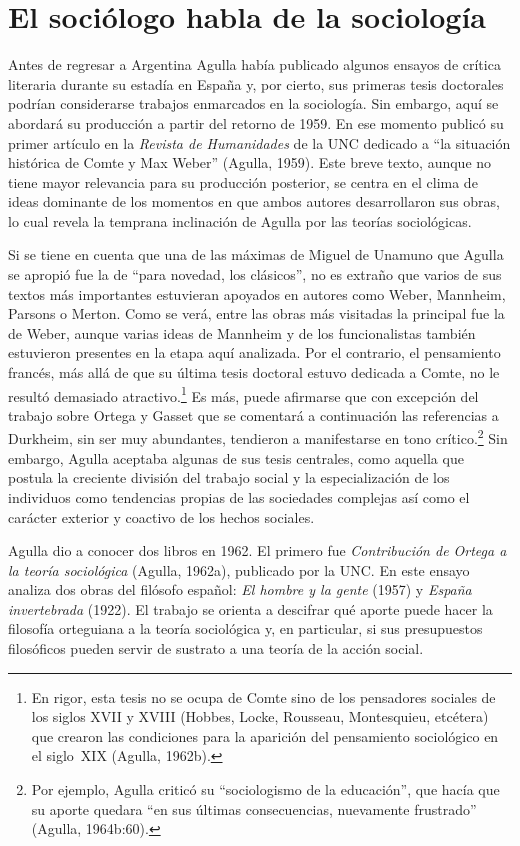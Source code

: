 \section{El sociólogo habla de la sociología}

Antes de regresar a Argentina Agulla había publicado algunos ensayos de crítica literaria durante su estadía en España y, por cierto, sus primeras tesis doctorales podrían considerarse trabajos enmarcados en la sociología. Sin embargo, aquí se abordará su producción a partir del retorno de 1959. En ese momento publicó su primer artículo en la \emph{Revista de Humanidades} de la UNC dedicado a ``la situación histórica de Comte y Max Weber'' (Agulla, 1959). Este breve texto, aunque no tiene mayor relevancia para su producción posterior, se centra en el clima de ideas dominante de los momentos en que ambos autores desarrollaron sus obras, lo cual revela la temprana inclinación de Agulla por las teorías sociológicas.

Si se tiene en cuenta que una de las máximas de Miguel de Unamuno que Agulla se apropió fue la de ``para novedad, los clásicos'', no es extraño que varios de sus textos más importantes estuvieran apoyados en autores como Weber, Mannheim, Parsons o Merton. Como se verá, entre las obras más visitadas la principal fue la de Weber, aunque varias ideas de Mannheim y de los funcionalistas también estuvieron presentes en la etapa aquí analizada. Por el contrario, el pensamiento francés, más allá de que su última tesis doctoral estuvo dedicada a Comte, no le resultó demasiado atractivo.\footnote{En rigor, esta tesis no se ocupa de Comte sino de los pensadores sociales de los siglos XVII y XVIII (Hobbes, Locke, Rousseau, Montesquieu, etcétera) que crearon las condiciones para la aparición del pensamiento sociológico en el siglo~XIX (Agulla, 1962b).} Es más, puede afirmarse que con excepción del trabajo sobre Ortega y Gasset que se comentará a continuación las referencias a Durkheim, sin ser muy abundantes, tendieron a manifestarse en tono crítico.\footnote{Por ejemplo, Agulla criticó su ``sociologismo de la educación'', que hacía que su aporte quedara ``en sus últimas consecuencias, nuevamente frustrado'' (Agulla, 1964b:60).} Sin embargo, Agulla aceptaba algunas de sus tesis centrales, como aquella que postula la creciente división del trabajo social y la especialización de los individuos como tendencias propias de las sociedades complejas así como el carácter exterior y coactivo de los hechos sociales.

Agulla dio a conocer dos libros en 1962. El primero fue \emph{Contribución de Ortega a la teoría sociológica} (Agulla, 1962a), publicado por la UNC. En este ensayo analiza dos obras del filósofo español: \emph{El hombre y la gente} (1957) y \emph{España invertebrada} (1922). El trabajo se orienta a descifrar qué aporte puede hacer la filosofía orteguiana a la teoría sociológica y, en particular, si sus presupuestos filosóficos pueden servir de sustrato a una teoría de la acción social.

